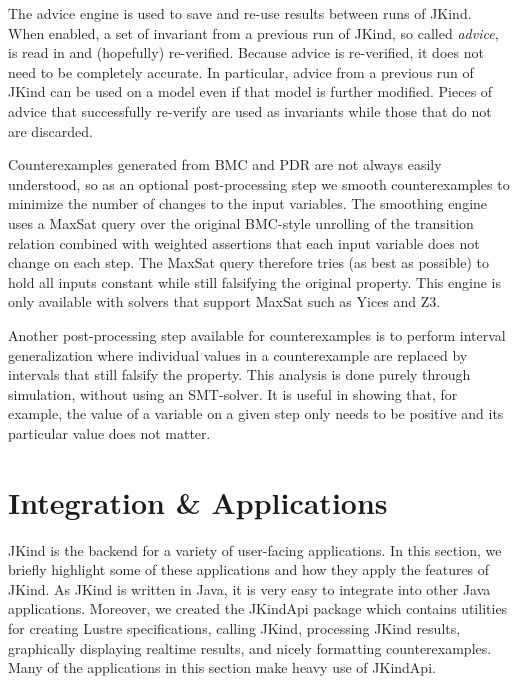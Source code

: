 \documentclass{llncs}
\newcommand{\jkind}{{\sc JKind}\xspace}
\newcommand{\jkindapi}{{\sc JKindApi}\xspace}
\newcommand{\lustre}{{\sc Lustre}\xspace}
\renewcommand{\paragraph}[1]{\vspace{5pt}\noindent {\bf #1}}
\begin{document}
\paragraph{Advice.} The advice engine is used to save and re-use
results between runs of \jkind. When enabled, a set of invariant from a
previous run of \jkind, so called {\em advice}, is read in and
(hopefully) re-verified. Because advice is re-verified, it does not
need to be completely accurate. In particular, advice from a previous
run of \jkind can be used on a model even if that model is further
modified. Pieces of advice that successfully re-verify are used as
invariants while those that do not are discarded.

\paragraph{Smoothing.} Counterexamples generated from BMC and PDR are
not always easily understood, so as an optional post-processing step
we smooth counterexamples to minimize the number of changes to the
input variables. The smoothing engine uses a {\sc MaxSat} query over
the original BMC-style unrolling of the transition relation combined
with weighted assertions that each input variable does not change on
each step. The {\sc MaxSat} query therefore tries (as best as
possible) to hold all inputs constant while still falsifying the
original property. This engine is only available with solvers that
support {\sc MaxSat} such as Yices and Z3.

\paragraph{Interval Generalization.} Another post-processing step
available for counterexamples is to perform interval generalization
where individual values in a counterexample are replaced by intervals
that still falsify the property. This analysis is done purely through
simulation, without using an SMT-solver. It is useful in showing
that, for example, the value of a variable on a given step only needs
to be positive and its particular value does not matter.

\section{Integration \& Applications}

\jkind is the backend for a variety of user-facing applications. In
this section, we briefly highlight some of these applications and how
they apply the features of JKind. As \jkind is written in Java, it is
very easy to integrate into other Java applications. Moreover, we
created the \jkindapi package which contains utilities for creating
\lustre specifications, calling \jkind, processing \jkind results,
graphically displaying realtime results, and nicely formatting
counterexamples. Many of the applications in this section make heavy
use of \jkindapi.
\end{document}
